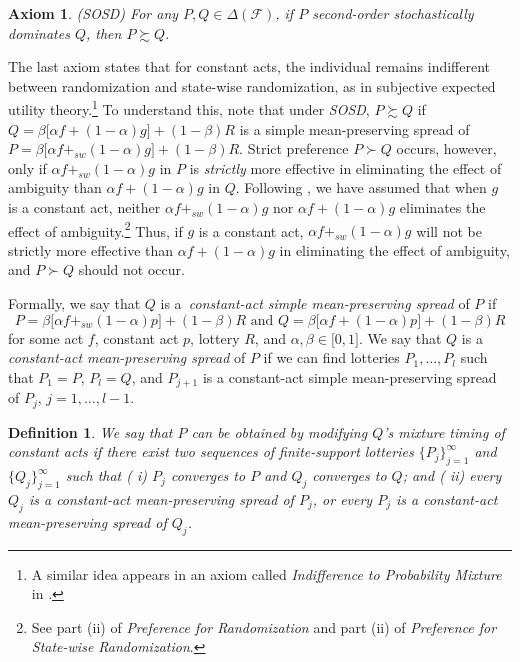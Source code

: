 \documentclass[12pt, notitlepage]{article}
\newtheorem{axiom}{Axiom}
\newtheorem{definition}{Definition}
\begin{document}
\begin{axiom}
(SOSD) For any $P,Q\in \Delta (\mathcal{F})$, if $P$ second-order
stochastically dominates $Q$, then $P\succsim Q$.
\end{axiom}

The last axiom states that for constant acts, the individual remains
indifferent between randomization and state-wise randomization, as in
subjective expected utility theory.\footnote{%
A similar idea appears in an axiom called \textit{Indifference to
Probability Mixture} in \cite{Saito13}.} To understand this, note that under 
\textit{SOSD}, $P\succsim Q$ if $Q=\beta \lbrack \alpha f+(1-\alpha
)g]+(1-\beta )R$ is a simple mean-preserving spread of $P=\beta \lbrack
\alpha f+_{sw}(1-\alpha )g]+(1-\beta )R$. Strict preference $P\succ Q$
occurs, however, only if $\alpha f+_{sw}(1-\alpha )g$ in $P$ is \textit{%
strictly} more effective in eliminating the effect of ambiguity than $\alpha
f+(1-\alpha )g$ in $Q$. Following \cite{GilboaSchmeidler89}, we have assumed
that when $g$ is a constant act, neither $\alpha f+_{sw}(1-\alpha )g$ nor $%
\alpha f+(1-\alpha )g$ eliminates the effect of ambiguity.\footnote{%
See part (\textrm{ii}) of \textit{Preference for Randomization} and part
(ii) of \textit{Preference for State-wise Randomization}.} Thus, if $g$ is a
constant act, $\alpha f+_{sw}(1-\alpha )g$ will not be strictly more
effective than $\alpha f+(1-\alpha )g$ in eliminating the effect of
ambiguity, and $P\succ Q$ should not occur.

Formally, we say that $Q$ is a\textit{\ constant-act simple mean-preserving
spread} of $P$ if%
\begin{equation*}
P=\beta \lbrack \alpha f+_{sw}(1-\alpha )p]+(1-\beta )R\text{ and }Q=\beta
\lbrack \alpha f+(1-\alpha )p]+(1-\beta )R
\end{equation*}%
for some act $f$, constant act $p$, lottery $R$, and $\alpha ,\beta \in
\lbrack 0,1]$. We say that $Q$ is a \textit{constant-act mean-preserving
spread} of $P$ if we can find lotteries $P_{1},\dots ,P_{l}$ such that $%
P_{1}=P$, $P_{l}=Q$, and $P_{j+1}$ is a constant-act simple mean-preserving
spread of $P_{j}$, $j=1,\dots ,l-1$.

\begin{definition}
We say that $P$ can be obtained by modifying $Q$'s mixture timing of
constant acts if there exist two sequences of finite-support lotteries $%
\{P_{j}\}_{j=1}^{\infty }$ and $\{Q_{j}\}_{j=1}^{\infty }$ such that (%
\textrm{i}) $P_{j}$ converges to $P$ and $Q_{j}$ converges to $Q$; and (%
\textrm{ii}) every $Q_{j}$ is a \textit{constant-act mean-preserving spread}
of $P_{j}$, or every $P_{j}$ is a constant-act \textit{mean-preserving spread%
} of $Q_{j}$.
\end{definition}
\end{document}
